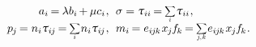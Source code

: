 {\begin{leftverticalbar}
\nopagebreak\vspace{-0.8em}
\begin{align*}
a_i \hspace{-0.2ex} = \hspace{-0.1ex} \lambda b_i \hspace{-0.2ex} + \hspace{-0.1ex} \mu c_i
\hspace{.1ex} , & \hspace{.6em}
%
\sigma
= \mathtau_{ii} \hspace{-0.2ex}
= \raisebox{.1em}{\scalebox{.66}{$ \hspace{-0.2ex} \displaystyle \sum_{\smash{\scalebox{.9}{$i$}}} \hspace{.2ex} $}} \mathtau_{ii}
\hspace{.1ex} ,
\\[-0.4em]
%
p_{\hspace{-0.1ex}j} \hspace{-0.2ex}
= n_i \mathtau_{i\hspace{-0.1ex}j} \hspace{-0.2ex}
= \raisebox{.1em}{\scalebox{.66}{$ \hspace{-0.2ex} \displaystyle \sum_{\smash{\scalebox{.9}{$i$}}} \hspace{.2ex} $}} n_i \mathtau_{i\hspace{-0.1ex}j}
\hspace{.1ex} , & \hspace{.6em}
%
m_i \hspace{-0.2ex}
= e_{i\hspace{-0.1ex}j\hspace{-0.1ex}k} \hspace{.15ex} x_{\hspace{-0.1ex}j} \hspace{-0.1ex} f_{\hspace{-0.1ex}k} \hspace{-0.2ex}
= \raisebox{.1em}{\scalebox{.66}{$ \hspace{-0.2ex} \displaystyle \sum_{\smash{\scalebox{.9}{$j,\hspace{-0.2ex}k$}}} \hspace{.2ex} $}}
e_{i\hspace{-0.1ex}j\hspace{-0.1ex}k} \hspace{.15ex} x_{\hspace{-0.1ex}j} \hspace{-0.1ex} f_{\hspace{-0.1ex}k}
\hspace{.1ex} .
\end{align*}


\end{leftverticalbar}}
